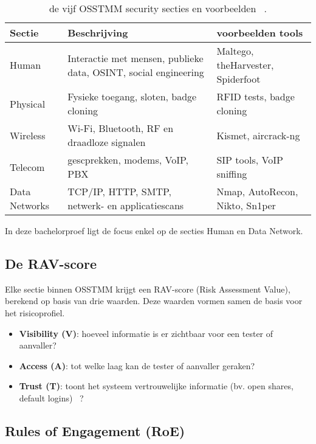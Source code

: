 \begin{table}[H]
    \centering
    \footnotesize
    \begin{tabularx}{\linewidth}{l X l}
      \toprule
      \textbf{Sectie} & \textbf{Beschrijving} & \textbf{voorbeelden tools} \\
      \midrule
      Human         & Interactie met mensen, publieke data, OSINT, social engineering   & Maltego, theHarvester, Spiderfoot \\
      Physical      & Fysieke toegang, sloten, badge cloning                            & RFID tests, badge cloning \\
      Wireless      & Wi-Fi, Bluetooth, RF en draadloze signalen                        & Kismet, aircrack-ng \\
      Telecom       & gescprekken, modems, VoIP, PBX                                    & SIP tools, VoIP sniffing \\
      Data Networks & TCP/IP, HTTP, SMTP, netwerk- en applicatiescans                   & Nmap, AutoRecon, Nikto, Sn1per \\
      \bottomrule
    \end{tabularx}
    \caption[OSSTMM secties]{\label{tab:channels}de vijf OSSTMM security secties en voorbeelden ~\autocite{Herzog}.}
\end{table}

In deze bachelorproef ligt de focus enkel op de secties Human en Data Network.

\subsection{De RAV-score}

Elke sectie binnen OSSTMM krijgt een RAV-score (Risk Assessment Value), berekend op basis van drie waarden.
Deze waarden vormen samen de basis voor het risicoprofiel.

\begin{itemize}
    \item \textbf{Visibility (V)}: hoeveel informatie is er zichtbaar voor een tester of aanvaller?
    \item \textbf{Access (A)}: tot welke laag kan de tester of aanvaller geraken?
    \item \textbf{Trust (T)}: toont het systeem vertrouwelijke informatie (bv. open shares, default logins) ~\autocite{Herzog}?
\end{itemize}


\subsection{Rules of Engagement (RoE)}

